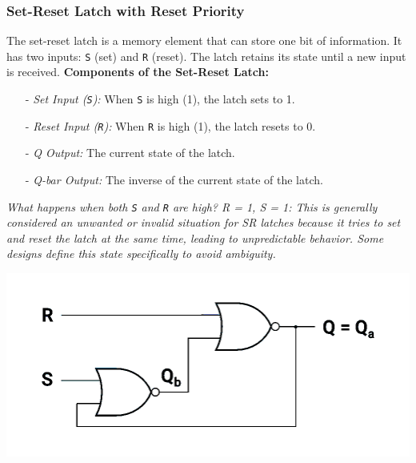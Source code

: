 \documentclass[12pt,openany]{book}
\begin{document}
\subsubsection{Set-Reset Latch with Reset Priority}
The set-reset latch is a memory element that can store one bit of information. It has two inputs: \texttt{S} (set) and \texttt{R} (reset). The latch retains its state until a new input is received. \newline
\vspace*{10px}
\textbf{Components of the Set-Reset Latch:}
\begin{itemize}
	\item[-] \textit{Set Input (\texttt{S}):} When \texttt{S} is high (1), the latch sets to 1.
	\item[-] \textit{Reset Input (\texttt{R}):} When \texttt{R} is high (1), the latch resets to 0.
	\item[-] \textit{Q Output:} The current state of the latch.
	\item[-] \textit{Q-bar Output:} The inverse of the current state of the latch.
\end{itemize}
\textit{What happens when both \texttt{S} and \texttt{R} are high? \newline
R = 1, S = 1: This is generally considered an unwanted or invalid situation for SR latches because it tries to set and reset the latch at the same time, leading to unpredictable behavior. Some designs define this state specifically to avoid ambiguity.}
\vspace*{10px}
\newline
\noindent
\begin{minipage}{0.40\textwidth}
	\begin{center}
		\includegraphics[width=1.2\textwidth]{circuits/12.1.3_2.png}
	\end{center}
\end{minipage}
\hfill
\hspace*{20px}
\end{document}
